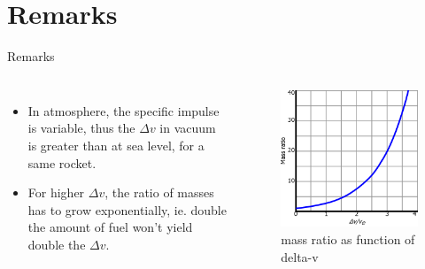 \documentclass{beamer}
\begin{document}
\section{Remarks}
\begin{frame}{Remarks}
\begin{columns}
    \begin{itemize}
        \item In atmosphere, the specific impulse is variable, thus the $\Delta v$ in vacuum is greater than at sea level, for a same rocket.
        \item For higher $\Delta v$, the ratio of masses has to grow exponentially, ie. double the amount of fuel won't yield double the $\Delta v$.
    \end{itemize}
    \begin{figure}
        \centering
        \includegraphics[width=\textwidth]{Tsiolkovsky_rocket_equation.png}
        \caption{mass ratio as function of delta-v}
        \label{fig:equation}
    \end{figure}
\end{columns}
\end{frame}
\end{document}
